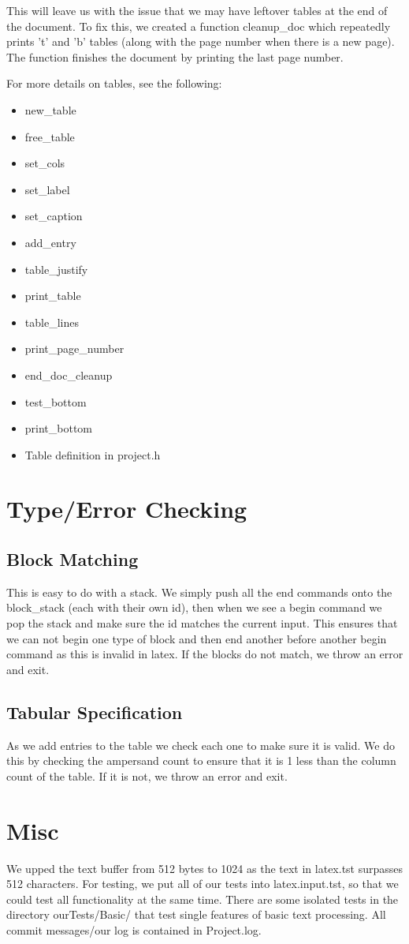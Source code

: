 This will leave us with the issue that we may have leftover tables at the end of the
document. To fix this, we created a function cleanup_doc which repeatedly prints 't' and 'b'
tables (along with the page number when there is a new page). The function finishes the 
document by printing the last page number.

For more details on tables, see the following:
\begin{itemize}
\item new_table
\item free_table
\item set_cols
\item set_label
\item set_caption
\item add_entry
\item table_justify
\item print_table
\item table_lines
\item print_page_number
\item end_doc_cleanup
\item test_bottom
\item print_bottom
\item Table definition in project.h
\end{itemize}

\section{Type/Error Checking}

\subsection{Block Matching}
This is easy to do with a stack. We simply push all the end commands onto the block_stack
(each with their own id), then when we see a begin command we pop the stack and make sure
the id matches the current input. This ensures that we can not begin one type of block and
then end another before another begin command as this is invalid in latex. If the blocks
do not match, we throw an error and exit.

\subsection{Tabular Specification}
As we add entries to the table we check each one to make sure it is valid. We do this by
checking the ampersand count to ensure that it is 1 less than the column count of the
table. If it is not, we throw an error and exit.

\section{Misc}
We upped the text buffer from 512 bytes to 1024 as the text in latex.tst surpasses 512
characters. For testing, we put all of our tests into latex.input.tst, so that we could test all functionality at the same time. There are some isolated tests in the directory ourTests/Basic/ that test single features of basic text processing. All commit messages/our log is contained in Project.log.


